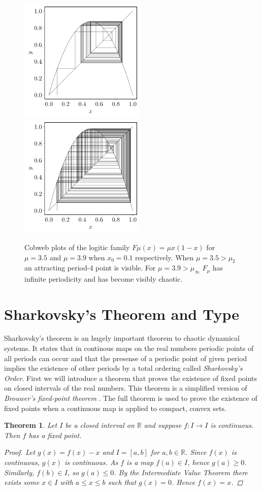 \documentclass[11pt,a4paper,oneside]{memoir}
\theoremstyle{plain}
\newtheorem{thm}{Theorem}[chapter]
\theoremstyle{definition}
\begin{document}
\begin{figure}[h]
    \centering
    \includegraphics[width=6cm]{cobweb_0.1_3.5.pdf}
    \includegraphics[width=6cm]{cobweb_0.1_3.9.pdf}
    \caption{Cobweb plots of the logitic family $F\mu(x) = \mu x(1-x)$ for $\mu = 3.5$ and $\mu = 3.9$ when $x_0 = 0.1$ respectively. When $\mu = 3.5 > \mu_2$ an attracting period-4 point is visible. For $\mu = 3.9 > \mu_\infty$ $F_\mu$ has infinite periodicity and has become visibly chaotic.}
    \label{fig:cobweb_3.5_3.9}
\end{figure}

\section{Sharkovsky's Theorem and Type}\label{sec:sharkovsky}
Sharkovsky's theorem \cite{sharkovsky} is an hugely important theorem to chaotic dynamical systems. It states that in continous maps on the real numbers periodic points of all periods can occur and that the presense of a periodic point of given period implies the existence of other periods by a total ordering called \emph{Sharkovsky's Order}. First we will introduce a theorem that proves the existence of fixed points on closed intervals of the real numbers. This theorem is a simplified version of \emph{Brouwer's fixed-point theorem} \cite{brouwer}. The full theorem is used to prove the existence of fixed points when a continuous map is applied to compact, convex sets.
\begin{thm} \label{thm:fixed-points}
    Let $I$ be a closed interval on $\mathbb{R}$ and suppose $f: I \to I$ is continuous. Then $f$ has a fixed point.
    \begin{proof}
        Let $g(x) = f(x) - x$ and $I = [a, b]$ for $a, b \in \mathbb{R}$. Since $f(x)$ is continuous, $g(x)$ is continuous. As $f$ is a map $f(a) \in I$, hence $g(a) \geq 0$. Similarly, $f(b) \in I$, so $g(a) \leq 0$. By the Intermediate Value Theorem there exists some $x \in I$ with $a \leq x \leq b$ such that $g(x) = 0$. Hence $f(x) = x$.
    \end{proof}
\end{thm}
\end{document}
